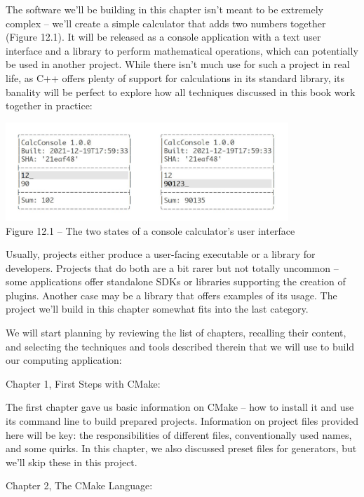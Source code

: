 

The software we'll be building in this chapter isn't meant to be extremely complex – we'll create a simple calculator that adds two numbers together (Figure 12.1). It will be released as a console application with a text user interface and a library to perform mathematical operations, which can potentially be used in another project. While there isn't much use for such a project in real life, as C++ offers plenty of support for calculations in its standard library, its banality will be perfect to explore how all techniques discussed in this book work together in practice:

\begin{center}
\includegraphics[width=0.8\textwidth]{content/3/chapter12/images/1.jpg}\\
Figure 12.1 – The two states of a console calculator's user interface
\end{center}

Usually, projects either produce a user-facing executable or a library for developers. Projects that do both are a bit rarer but not totally uncommon – some applications offer standalone SDKs or libraries supporting the creation of plugins. Another case may be a library that offers examples of its usage. The project we'll build in this chapter somewhat fits into the last category.

We will start planning by reviewing the list of chapters, recalling their content, and selecting the techniques and tools described therein that we will use to build our computing application: 

Chapter 1, First Steps with CMake: 

The first chapter gave us basic information on CMake – how to install it and use its command line to build prepared projects. Information on project files provided here will be key: the responsibilities of different files, conventionally used names, and some quirks. In this chapter, we also discussed preset files for generators, but we'll skip these in this project.

Chapter 2, The CMake Language: 

